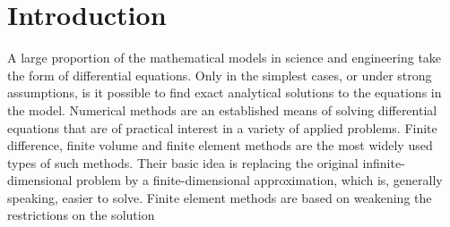
\section{Introduction}
A large proportion of the mathematical models in science and engineering take the
form of differential equations. Only in the simplest cases, or under strong assumptions,
is it possible to find exact analytical solutions to the equations in the model.
%
%
%
%
%
Numerical methods are an established means of solving differential equations that are
of practical interest in a variety of applied problems. Finite difference, finite volume
and finite element methods are the most widely used types of such methods. Their
basic idea is replacing the original infinite-dimensional problem by a finite-dimensional
approximation, which is, generally speaking, easier to solve.
%
Finite element methods are based on weakening the restrictions on the solution
